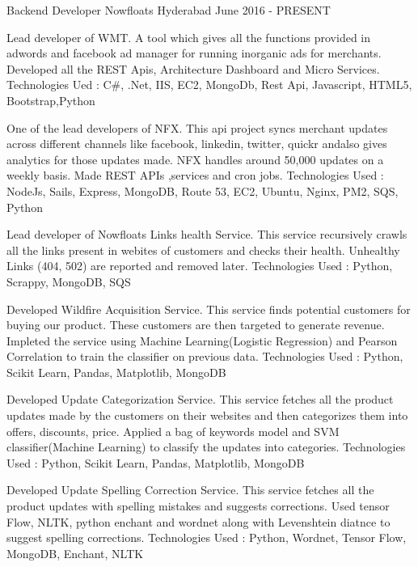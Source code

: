 

\begin{cventries}

  \cventry
    {Backend Developer} %
    {Nowfloats} %
    {Hyderabad} %
    {June 2016 - PRESENT} %
    {
      \begin{cvitems} %
        \item {Lead developer of WMT. A tool which gives all the functions provided in adwords and facebook ad manager for running inorganic ads for merchants. Developed all the REST Apis, Architecture Dashboard and Micro Services. Technologies Ued : C\#, .Net, IIS, EC2, MongoDb, Rest Api, Javascript, HTML5, Bootstrap,Python}
        \item {One of the lead developers of NFX. This api project syncs merchant updates across different channels like facebook, linkedin, twitter, quickr andalso gives analytics for those updates made. NFX handles around 50,000 updates on a weekly basis. Made REST APIs ,services and cron jobs. Technologies Used : NodeJs, Sails, Express, MongoDB, Route 53, EC2, Ubuntu, Nginx, PM2, SQS, Python}
        \item {Lead developer of Nowfloats Links health Service. This service recursively crawls all the links present in webites of customers and checks their health. Unhealthy Links (404, 502) are reported and removed later. Technologies Used : Python, Scrappy, MongoDB, SQS  }
        \item {Developed Wildfire Acquisition Service. This service finds potential customers for buying our product. These customers are then targeted to generate revenue. Impleted the service using Machine Learning(Logistic Regression) and Pearson Correlation to train the classifier on previous data. Technologies Used : Python, Scikit Learn, Pandas, Matplotlib, MongoDB  }
        \item {Developed Update Categorization Service. This service fetches all the product updates made by the customers on their websites and then categorizes them into offers, discounts, price. Applied a bag of keywords model and SVM classifier(Machine Learning) to classify the updates into categories. Technologies Used : Python, Scikit Learn, Pandas, Matplotlib, MongoDB  }
        \item {Developed Update Spelling Correction Service. This service fetches all the product updates with spelling mistakes and suggests corrections. Used tensor Flow, NLTK, python enchant and wordnet along with Levenshtein diatnce to suggest spelling corrections. Technologies Used : Python, Wordnet, Tensor Flow, MongoDB, Enchant, NLTK  }
      \end{cvitems}
    }


\end{cventries}
